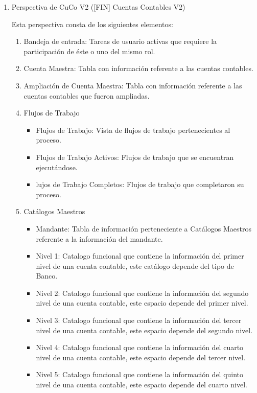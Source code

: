 \begin{enumerate}
    \item Perspectiva de CuCo V2 ([FIN] Cuentas Contables V2) 
    
    Esta perspectiva consta de los siguientes elementos:

    \begin{enumerate}
        \item Bandeja de entrada: Tareas de usuario activas que requiere la participación de éste o uno del mismo rol.
        \item Cuenta Maestra: Tabla con información referente a las cuentas contables.
        \item Ampliación de Cuenta Maestra: Tabla con información referente a las cuentas contables que fueron ampliadas.
        \item Flujos de Trabajo
        \begin{itemize}
            \item Flujos de Trabajo: Vista de flujos de trabajo pertenecientes al proceso.
            \item Flujos de Trabajo Activos: Flujos de trabajo que se encuentran ejecutándose.
            \item lujos de Trabajo Completos: Flujos de trabajo que completaron su proceso. 
        \end{itemize}
        \item Catálogos Maestros
        \begin{itemize}
            \item Mandante: Tabla de información perteneciente a Catálogos Maestros referente a la información del mandante.
            \item Nivel 1: Catalogo funcional que contiene la información del primer nivel de una cuenta contable, este catálogo depende del tipo de Banco.
            \item Nivel 2: Catalogo funcional que contiene la información del segundo nivel de una cuenta contable, este espacio depende del primer nivel. 
            \item Nivel 3: Catalogo funcional que contiene la información del tercer nivel de una cuenta contable, este espacio depende del segundo nivel.
            \item Nivel 4: Catalogo funcional que contiene la información del cuarto nivel de una cuenta contable, este espacio depende del tercer nivel.
            \item Nivel 5: Catalogo funcional que contiene la información del quinto nivel de una cuenta contable, este espacio depende del cuarto nivel.

\end{itemize}
\end{enumerate}
\end{enumerate}
